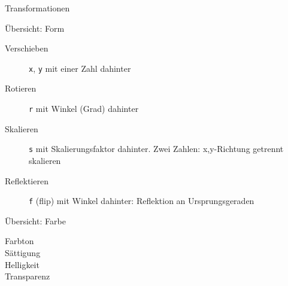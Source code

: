 \documentclass{beamer}
\theoremstyle{example}
\begin{document}
\begin{frame}{Transformationen}
\begin{block}{Übersicht: Form}
  \begin{description}
  \item[Verschieben] \lstinline!x!, \lstinline!y! mit einer Zahl dahinter
  \item[Rotieren] \lstinline!r! mit Winkel (Grad) dahinter
  \item[Skalieren] \lstinline!s! mit Skalierungsfaktor dahinter. Zwei Zahlen: x,y-Richtung getrennt skalieren
  \item[Reflektieren] \lstinline!f! (flip) mit Winkel dahinter: Reflektion an Ursprungsgeraden
  \end{description}
\end{block}
\begin{block}{Übersicht: Farbe}
  \begin{description}
  \item[Farbton]
  \item[Sättigung]
  \item[Helligkeit]
  \item[Transparenz] 
  \end{description}
\end{block}
\end{frame}
\end{document}
